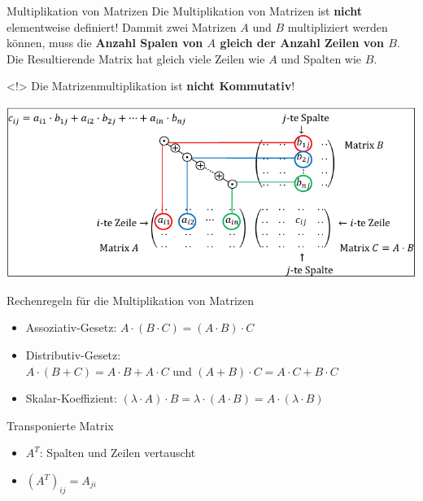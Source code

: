     

    \begin{definition}{Multiplikation von Matrizen}
        Die Multiplikation von Matrizen ist \textbf{nicht} elementweise definiert!
        Dammit zwei Matrizen $A$ und $B$ multipliziert werden können,
        muss die \textbf{Anzahl Spalen von $A$ gleich der Anzahl Zeilen von $B$}.
        Die Resultierende Matrix hat gleich viele Zeilen wie $A$ und Spalten wie $B$. 
        \begin{highlight}{<!>}
            Die Matrizenmultiplikation ist \textbf{nicht Kommutativ}!
        \end{highlight}
        \begin{center}
            \includegraphics[width=0.8\linewidth]{mat-mat-mul.png}
        \end{center}
    \end{definition}
    
    \begin{theorem}{Rechenregeln für die Multiplikation von Matrizen}
        \begin{itemize}
            \item Assoziativ-Gesetz: $A\cdot(B\cdot C)=(A\cdot B)\cdot C$
            \item Distributiv-Gesetz: \\
                $A\cdot(B+C)=A\cdot B+A\cdot C$ und $(A+B)\cdot C=A\cdot C+B\cdot C$
            \item Skalar-Koeffizient: $(\lambda\cdot A)\cdot B=\lambda\cdot (A\cdot B)=A\cdot(\lambda\cdot B)$
        \end{itemize}
    \end{theorem}

    \begin{definition}{Transponierte Matrix}
        \begin{itemize}
            \item $A^T$: Spalten und Zeilen vertauscht
            \item $(A^T)_{ij} = A_{ji}$
        \end{itemize}
    \end{definition}
    
